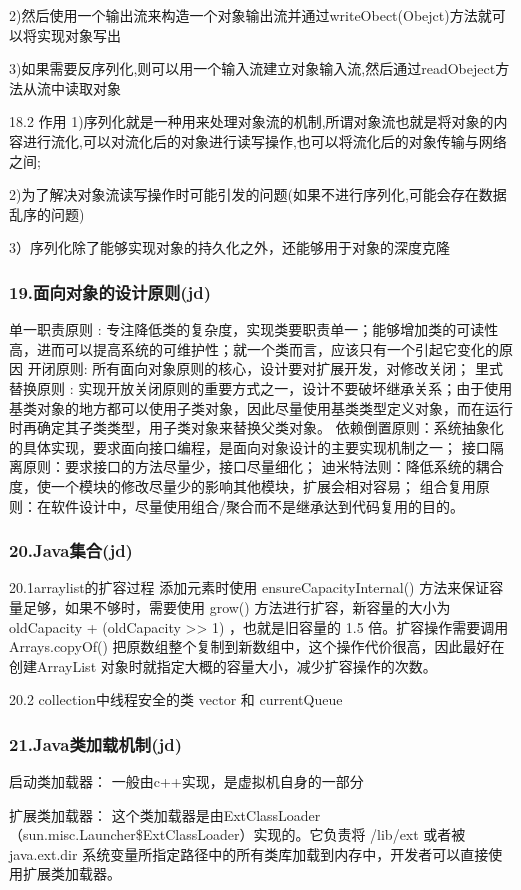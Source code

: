 \documentclass[UTF8]{ctexart}
\begin{document}
2)然后使用一个输出流来构造一个对象输出流并通过writeObect(Obejct)方法就可以将实现对象写出

3)如果需要反序列化,则可以用一个输入流建立对象输入流,然后通过readObeject方法从流中读取对象

18.2 作用
1)序列化就是一种用来处理对象流的机制,所谓对象流也就是将对象的内容进行流化,可以对流化后的对象进行读写操作,也可以将流化后的对象传输与网络之间;

2)为了解决对象流读写操作时可能引发的问题(如果不进行序列化,可能会存在数据乱序的问题)

3）序列化除了能够实现对象的持久化之外，还能够用于对象的深度克隆

\subsubsection{19.面向对象的设计原则(jd)}
单一职责原则 : 专注降低类的复杂度，实现类要职责单一；能够增加类的可读性高，进而可以提高系统的可维护性；就一个类而言，应该只有一个引起它变化的原因
开闭原则: 所有面向对象原则的核心，设计要对扩展开发，对修改关闭；
里式替换原则 : 实现开放关闭原则的重要方式之一，设计不要破坏继承关系；由于使用基类对象的地方都可以使用子类对象，因此尽量使用基类类型定义对象，而在运行时再确定其子类类型，用子类对象来替换父类对象。
依赖倒置原则：系统抽象化的具体实现，要求面向接口编程，是面向对象设计的主要实现机制之一；
接口隔离原则：要求接口的方法尽量少，接口尽量细化；
迪米特法则：降低系统的耦合度，使一个模块的修改尽量少的影响其他模块，扩展会相对容易；
组合复用原则：在软件设计中，尽量使用组合/聚合而不是继承达到代码复用的目的。
\subsubsection{20.Java集合(jd)}
20.1arraylist的扩容过程
添加元素时使用 ensureCapacityInternal() 方法来保证容量足够，如果不够时，需要使用 grow() 方法进行扩容，新容量的大小为 oldCapacity + (oldCapacity >> 1) ，也就是旧容量的 1.5 倍。扩容操作需要调用Arrays.copyOf() 把原数组整个复制到新数组中，这个操作代价很高，因此最好在创建ArrayList 对象时就指定大概的容量大小，减少扩容操作的次数。

20.2 collection中线程安全的类
vector 和 currentQueue

\subsubsection{21.Java类加载机制(jd)}
启动类加载器： 一般由c++实现，是虚拟机自身的一部分

扩展类加载器： 这个类加载器是由ExtClassLoader（sun.misc.Launcher\$ExtClassLoader）实现的。它负责将 /lib/ext 或者被java.ext.dir 系统变量所指定路径中的所有类库加载到内存中，开发者可以直接使用扩展类加载器。
\end{document}
